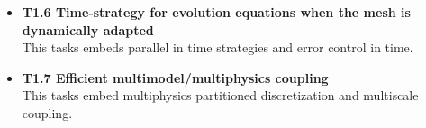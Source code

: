\begin{itemize}
    \item {\bf T1.6 Time-strategy for evolution equations when the mesh is dynamically adapted}\\
    This tasks embeds parallel in time strategies and error control in time.
    \item {\bf T1.7 Efficient multimodel/multiphysics coupling}\\
    This tasks embed multiphysics partitioned discretization and multiscale coupling.    

\end{itemize}
